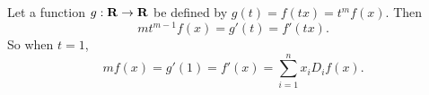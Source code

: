 
\begin{solution}
    Let a function $g:\mathbf{R}\to\mathbf{R}$ be
    defined by $g(t)=f(tx)=t^mf(x)$.
    Then
    $$mt^{m-1}f(x)=g'(t)=f'(tx).$$
    So when $t=1$,
    $$mf(x)=g'(1)=f'(x)=
    \sum_{i=1}^n{x_iD_if(x)}.$$
    \hfill\qedsymbol
\end{solution}